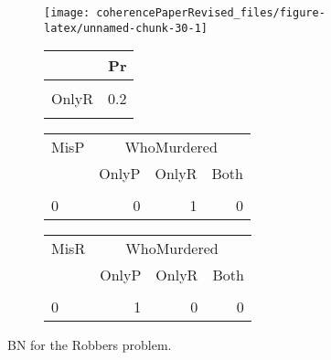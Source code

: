 \documentclass[10pt,]{scrartcl}
\begin{document}
\begin{figure}
\begin{subfigure}[!ht]{0.4\textwidth}

\begin{center}\texttt{[image: coherencePaperRevised\_files/figure-latex/unnamed-chunk-30-1]} \end{center}
\end{subfigure} \hfill
\begin{subfigure}[!ht]{0.6\textwidth}
\begin{table}[H]
\centering\begingroup\fontsize{9}{11}\selectfont

\begin{tabular}{lr}
\toprule
  & Pr\\
\midrule
\cellcolor{gray!6}{OnlyP} & \cellcolor{gray!6}{0.2}\\
OnlyR & 0.2\\
\cellcolor{gray!6}{Both} & \cellcolor{gray!6}{0.6}\\
\bottomrule
\end{tabular}
\endgroup{}
\end{table}

\begin{table}[H]
\centering\begingroup\fontsize{9}{11}\selectfont

\begin{tabular}{lrrr}
\toprule
\multicolumn{1}{c}{MisP} & \multicolumn{3}{c}{WhoMurdered} \\
  & OnlyP & OnlyR & Both\\
\midrule
\cellcolor{gray!6}{1} & \cellcolor{gray!6}{1} & \cellcolor{gray!6}{0} & \cellcolor{gray!6}{1}\\
0 & 0 & 1 & 0\\
\bottomrule
\end{tabular}
\endgroup{}
\end{table}

\begin{table}[H]
\centering\begingroup\fontsize{9}{11}\selectfont

\begin{tabular}{lrrr}
\toprule
\multicolumn{1}{c}{MisR} & \multicolumn{3}{c}{WhoMurdered} \\
  & OnlyP & OnlyR & Both\\
\midrule
\cellcolor{gray!6}{1} & \cellcolor{gray!6}{0} & \cellcolor{gray!6}{1} & \cellcolor{gray!6}{1}\\
0 & 1 & 0 & 0\\
\bottomrule
\end{tabular}
\endgroup{}
\end{table}
\end{subfigure}
\caption{BN for the \textsf{Robbers} problem.}
\label{fig:Robbers}
\end{figure}
\end{document}
